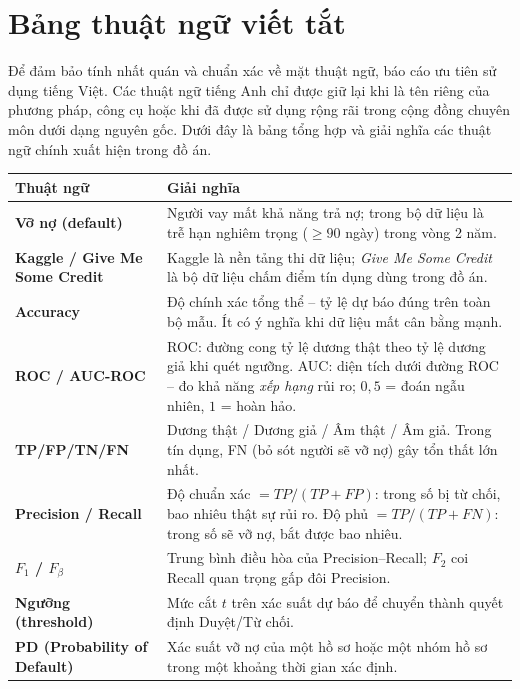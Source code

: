 \documentclass[12pt,a4paper,oneside]{report}
\theoremstyle{vnplain}
\theoremstyle{vndef}
\begin{document}
\tableofcontents
\listoffigures

\chapter*{Bảng thuật ngữ viết tắt}

Để đảm bảo tính nhất quán và chuẩn xác về mặt thuật ngữ, báo cáo ưu tiên sử dụng tiếng Việt. Các thuật ngữ tiếng Anh chỉ được giữ lại khi là tên riêng của phương pháp, công cụ hoặc khi đã được sử dụng rộng rãi trong cộng đồng chuyên môn dưới dạng nguyên gốc. Dưới đây là bảng tổng hợp và giải nghĩa các thuật ngữ chính xuất hiện trong đồ án.

\begin{longtable}{>{\raggedright\arraybackslash\bfseries}p{4.1cm} p{10.1cm}}
\toprule
\textmd{\bfseries Thuật ngữ} & \textbf{Giải nghĩa}\\
\midrule
\endhead
Vỡ nợ (default) & Người vay mất khả năng trả nợ; trong bộ dữ liệu là trễ hạn nghiêm trọng ($\ge 90$ ngày) trong vòng 2 năm.\\
Kaggle / Give Me Some Credit & Kaggle là nền tảng thi dữ liệu; \emph{Give Me Some Credit} là bộ dữ liệu chấm điểm tín dụng dùng trong đồ án.\\
Accuracy & Độ chính xác tổng thể -- tỷ lệ dự báo đúng trên toàn bộ mẫu. Ít có ý nghĩa khi dữ liệu mất cân bằng mạnh.\\
ROC / AUC-ROC & ROC: đường cong tỷ lệ dương thật theo tỷ lệ dương giả khi quét ngưỡng. AUC: diện tích dưới đường ROC -- đo khả năng \emph{xếp hạng} rủi ro; $0{,}5$ = đoán ngẫu nhiên, $1$ = hoàn hảo.\\
TP/FP/TN/FN & Dương thật / Dương giả / Âm thật / Âm giả. Trong tín dụng, FN (bỏ sót người sẽ vỡ nợ) gây tổn thất lớn nhất.\\
Precision / Recall & Độ chuẩn xác $=TP/(TP{+}FP)$: trong số bị từ chối, bao nhiêu thật sự rủi ro. Độ phủ $=TP/(TP{+}FN)$: trong số sẽ vỡ nợ, bắt được bao nhiêu.\\
$F_1$ / $F_\beta$ & Trung bình điều hòa của Precision--Recall; $F_2$ coi Recall quan trọng gấp đôi Precision.\\
Ngưỡng (threshold) & Mức cắt $t$ trên xác suất dự báo để chuyển thành quyết định Duyệt/Từ chối.\\
PD (Probability of Default) & Xác suất vỡ nợ của một hồ sơ hoặc một nhóm hồ sơ trong một khoảng thời gian xác định.\\

\end{longtable}
\end{document}
